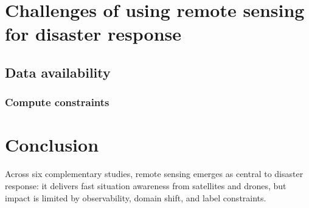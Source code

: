 \documentclass[conference,a4paper]{IEEEtran}
\begin{document}

\section{Challenges of using remote sensing for disaster response}

\subsection{Data availability}


\subsubsection{Compute constraints}


\section{Conclusion}

Across six complementary studies, remote sensing emerges as central to disaster response: it delivers fast situation awareness from satellites and drones, but impact is limited by observability, domain shift, and label constraints.
\end{document}
